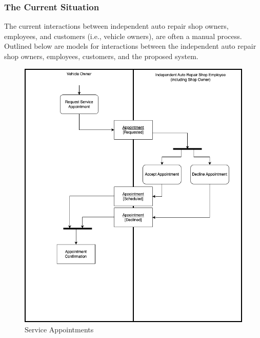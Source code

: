\documentclass[12pt]{article}
\begin{document}
\subsubsection{The Current Situation}
The current interactions between independent auto repair shop owners, employees, and customers
(i.e., vehicle owners), are often a manual process. Outlined below are models for interactions
between the independent auto repair shop owners, employees, customers, and the proposed system.
\begin{figure}[!hbp]
	\centering
	\includegraphics[width=\linewidth/2]{./diagrams/Appointments.png}
	\caption{Service Appointments}
\end{figure}
\FloatBarrier
\end{document}
